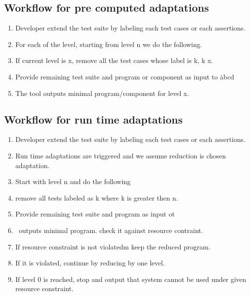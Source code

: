 \subsection{Workflow for pre computed adaptations}
\begin{enumerate}
\item Developer extend the test suite by labeling each test cases or each assertions. 
\item For each of the level, starting from level n we do the following.
\item If current level is x, remove all the test cases whose label is k, k  x.
\item Provide remaining test suite and program or component as input to \mytool\. abcd
\item The tool outputs minimal program/component for level x.   
\end{enumerate} 

\subsection{Workflow for run time adaptations}

\begin{enumerate}
\item Developer extend the test suite by labeling each test cases or each assertions.
\item Run time adaptations are triggered and we assume reduction is chosen adaptation.
\item Start with level n and do the following
\item remove all tests labeled as k where k is greater then n. 
\item Provide remaining test suite and program as input ot \mytool\
\item \mytool\ outputs minimal program. check it against resource contraint.
\item If resource constraint is not violatedm keep the reduced program.
\item If it is violated, continue by reducing by one level. 
\item If level 0 is reached, stop and output that system cannot be used under given resource constraint.
\end{enumerate}


